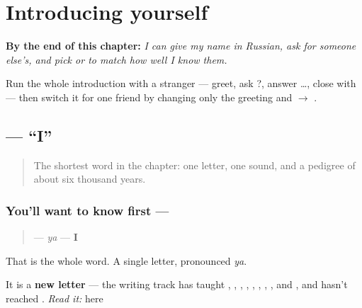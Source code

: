 
\chapter{Introducing yourself}
\label{ch:russian-introductions}

\begin{chapteropening}
\textbf{By the end of this chapter:} \emph{I can give my name in Russian, ask for someone else's, and pick  or  to match how well I know them.}

Run the whole introduction with a stranger — greet, ask   ?, answer  …, close with   — then switch it for one friend by changing only the greeting and  $\to$ .
\end{chapteropening}

\section[\texorpdfstring{\ru{я} (ya)}{я (ya)}]{ — \textquotedblleft{}I\textquotedblright{}}

\label{lesson:RU-C02-ya}



\begin{quote}
The shortest word in the chapter: one letter, one sound, and a pedigree of about six thousand years.
\end{quote}

\subsection*{You'll want to know first — }
\begin{quote}
\textbf{} — \emph{ya} — \textbf{I}
\end{quote}

That is the whole word. A single letter, pronounced \emph{ya}.

It is a \textbf{new letter} — the writing track has taught , , , , , , , ,  and , and hasn't reached \textbf{}. \emph{Read it:} \textbf{} here

